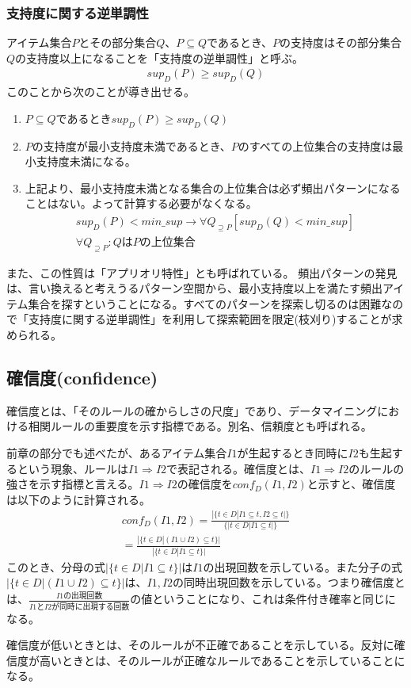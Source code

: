 \documentclass[dvipdfmx]{jsarticle}
\begin{document}
\subsubsection{支持度に関する逆単調性}
アイテム集合$P$とその部分集合$Q$、$P \subseteq Q$であるとき、$P$の支持度はその部分集合$Q$の支持度以上になることを「支持度の逆単調性」と呼ぶ。
\begin{gather*}
  sup_{D}(P) \geq sup_{D}(Q)
\end{gather*}
このことから次のことが導き出せる。
\begin{enumerate}
  \item $P \subseteq Q$であるとき$sup_{D}(P) \geq sup_{D}(Q)$
  \item $P$の支持度が最小支持度未満であるとき、$P$のすべての上位集合の支持度は最小支持度未満になる。
  \item 上記より、最小支持度未満となる集合の上位集合は必ず頻出パターンになることはない。よって計算する必要がなくなる。
  \begin{gather*}
    sup_{D}(P) < min\_sup \to \forall Q_{\supseteq P}[sup_{D}(Q) < min\_sup]\\
    \forall Q_{\supseteq P}:QはPの上位集合
  \end{gather*}
\end{enumerate}
また、この性質は「アプリオリ特性」とも呼ばれている。
頻出パターンの発見は、言い換えると考えうるパターン空間から、最小支持度以上を満たす頻出アイテム集合を探すということになる。すべてのパターンを探索し切るのは困難なので「支持度に関する逆単調性」を利用して探索範囲を限定(枝刈り)することが求められる。

\subsection{確信度(confidence)}
確信度とは、「そのルールの確からしさの尺度」であり、データマイニングにおける相関ルールの重要度を示す指標である。別名、信頼度とも呼ばれる。\par
前章の部分でも述べたが、あるアイテム集合$I1$が生起するとき同時に$I2$も生起するという現象、ルールは$I1 \Rightarrow I2$で表記される。確信度とは、$I1 \Rightarrow I2$のルールの強さを示す指標と言える。$I1 \Rightarrow I2$の確信度を$conf_{D}(I1, I2)$と示すと、確信度は以下のように計算される。
\begin{gather*}
  conf_{D}(I1, I2) = \frac{|\{t \in D|I1 \subseteq t, I2 \subseteq t|\}}{\{|t \in D | I1 \subseteq t|\}}\\
  =\frac{|\{t \in D | (I1 \cup I2) \subseteq t\}|}{|\{t \in D | I1 \subseteq t\}|}
\end{gather*}
このとき、分母の式$|\{t \in D | I1 \subseteq t\}|$は$I1$の出現回数を示している。また分子の式$|\{t \in D | (I1 \cup I2) \subseteq t\}|$は、$I1, I2$の同時出現回数を示している。つまり確信度とは、$\frac{I1の出現回数}{I1とI2が同時に出現する回数}$の値ということになり、これは条件付き確率と同じになる。\par
確信度が低いときとは、そのルールが不正確であることを示している。反対に確信度が高いときとは、そのルールが正確なルールであることを示していることになる。
\end{document}
